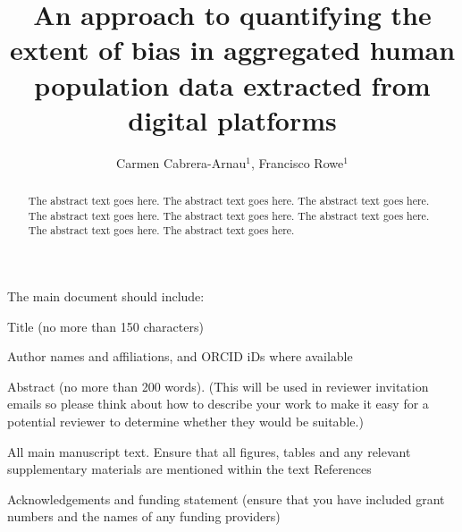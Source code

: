 \documentclass[]{rsos}%
\begin{document}
\title{An approach to quantifying the extent of bias in aggregated human population data extracted from digital platforms}

\author{
Carmen Cabrera-Arnau$^{1}$,
Francisco Rowe$^{1}$}

\address{
  $^{1}$Geographic Data Science Lab, Department of Geography and Planning, University of Liverpool, Liverpool, United Kingdom.\\
  $^{}$}
\subject{
subject 1,
subject 2,
subject 3}



\begin{abstract}
The abstract text goes here. The abstract text goes here. The abstract text goes here. The abstract text goes here. The abstract text goes here. The abstract text goes here. The abstract text goes here. The abstract text goes here.
\end{abstract}

\providecommand{\EndFirstPage}{%
}

\maketitle

The main document should include:

Title (no more than 150 characters)

Author names and affiliations, and ORCID iDs where available

Abstract (no more than 200 words). (This will be used in reviewer invitation emails so please think about how to describe your work to make it easy for a potential reviewer to determine whether they would be suitable.)

All main manuscript text. Ensure that all figures, tables and any relevant supplementary materials are mentioned within the text References

Acknowledgements and funding statement (ensure that you have included grant numbers and the names of any funding providers)
\end{document}
